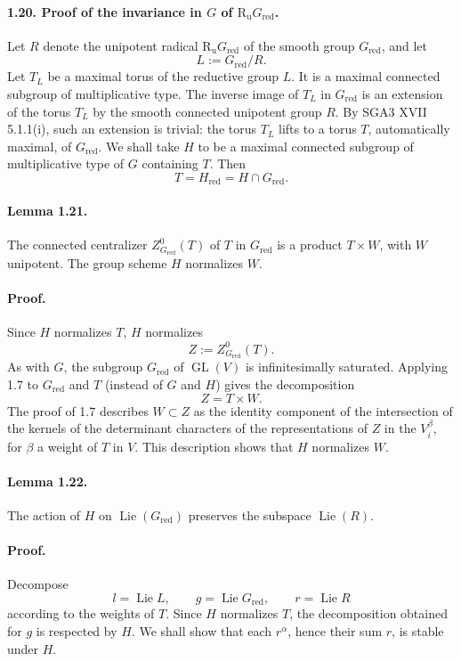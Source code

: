 \documentclass[11pt]{article}
\newcommand{\Lie}{\operatorname{Lie}}
\newcommand{\GL}{\operatorname{GL}}
\newcommand{\Ru}{\operatorname{R_u}}
\newcommand{\red}{\mathrm{red}}
\theoremstyle{plain}
\theoremstyle{definition}
\begin{document}
\paragraph{1.20. Proof of the invariance in $G$ of $\Ru G_{\red}$.} Let $R$ denote the unipotent radical $\Ru G_{\red}$ of the smooth group $G_{\red}$, and let
\[
   L:=G_{\red}/R.
\]
Let $T_L$ be a maximal torus of the reductive group $L$. It is a maximal connected subgroup of multiplicative type. The inverse image of $T_L$ in $G_{\red}$ is an extension of the torus $T_L$ by the smooth connected unipotent group $R$. By SGA3 XVII 5.1.1(i), such an extension is trivial: the torus $T_L$ lifts to a torus $T$, automatically maximal, of $G_{\red}$. We shall take $H$ to be a maximal connected subgroup of multiplicative type of $G$ containing $T$. Then
\[
   T=H_{\red}=H\cap G_{\red}.
\]

\paragraph{Lemma 1.21.} The connected centralizer $Z^0_{G_{\red}}(T)$ of $T$ in $G_{\red}$ is a product $T\times W$, with $W$ unipotent. The group scheme $H$ normalizes $W$.

\paragraph{Proof.} Since $H$ normalizes $T$, $H$ normalizes
\[
   Z:=Z^0_{G_{\red}}(T).
\]
As with $G$, the subgroup $G_{\red}$ of $\GL(V)$ is infinitesimally saturated. Applying 1.7 to $G_{\red}$ and $T$ (instead of $G$ and $H$) gives the decomposition
\[
   Z=T\times W.
\]
The proof of 1.7 describes $W\subset Z$ as the identity component of the intersection of the kernels of the determinant characters of the representations of $Z$ in the $V_i^\beta$, for $\beta$ a weight of $T$ in $V$. This description shows that $H$ normalizes $W$.

\paragraph{Lemma 1.22.} The action of $H$ on $\Lie(G_{\red})$ preserves the subspace $\Lie(R)$.

\paragraph{Proof.} Decompose
\[
   l=\Lie L,
   \qquad g=\Lie G_{\red},
   \qquad r=\Lie R
\]
according to the weights of $T$. Since $H$ normalizes $T$, the decomposition obtained for $g$ is respected by $H$. We shall show that each $r^\alpha$, hence their sum $r$, is stable under $H$.
\end{document}
